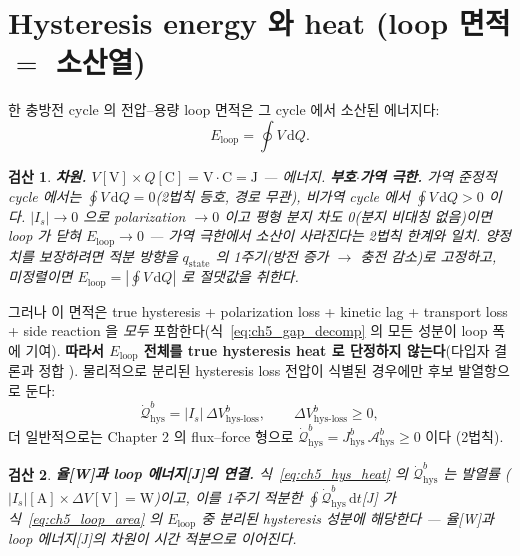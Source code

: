 \documentclass[11pt,a4paper]{article}
\newtheorem*{verifybox}{검산}
\newcommand{\dd}{\mathrm{d}}
\newcommand{\hys}{\mathrm{hys}}
\newcommand{\loss}{\mathrm{loss}}
\newcommand{\stt}{\mathrm{state}}
\begin{document}
\section{Hysteresis energy 와 heat (loop 면적 $=$ 소산열)}\label{sec:ch5_hysheat}
한 충방전 cycle 의 전압--용량 loop 면적은 그 cycle 에서 소산된 에너지다:
\begin{equation}
E_{\mathrm{loop}}=\oint V\,\dd Q.
\label{eq:ch5_loop_area}
\end{equation}

\begin{verifybox}
\textbf{차원.} $V[\mathrm V]\times Q[\mathrm C]=\mathrm{V\cdot C}=\mathrm J$ — 에너지. \textbf{부호$\cdot$가역
극한.} 가역 준정적 cycle 에서는 $\oint V\,\dd Q=0$(2법칙 등호, 경로 무관), 비가역 cycle 에서 $\oint V\,\dd Q>0$
이다. $|I_s|\to0$ 으로 polarization $\to0$ 이고 평형 분지 차도 0(분지 비대칭 없음)이면 loop 가 닫혀
$E_{\mathrm{loop}}\to0$ — 가역 극한에서 소산이 사라진다는 2법칙 한계와 일치. 양정치를 보장하려면 적분 방향을
$q_\stt$ 의 1주기(방전 증가 $\to$ 충전 감소)로 고정하고, 미정렬이면 $E_{\mathrm{loop}}=|\oint V\,\dd Q|$ 로
절댓값을 취한다.
\end{verifybox}

그러나 이 면적은 true hysteresis + polarization loss + kinetic lag + transport loss + side reaction 을
\emph{모두} 포함한다(식~\eqref{eq:ch5_gap_decomp} 의 모든 성분이 loop 폭에 기여). \textbf{따라서
$E_{\mathrm{loop}}$ 전체를 true hysteresis heat 로 단정하지 않는다}(다입자 결론과 정합 \cite{dreyer2010}).
물리적으로 분리된 hysteresis loss 전압이 식별된 경우에만 후보 발열항으로 둔다:
\begin{equation}
\dot{\mathcal Q}_{\hys}^b=|I_s|\,\Delta V_{\hys\text{-}\loss}^b,\qquad \Delta V_{\hys\text{-}\loss}^b\ge0,
\label{eq:ch5_hys_heat}
\end{equation}
더 일반적으로는 Chapter 2 의 flux--force 형으로 $\dot{\mathcal Q}_{\hys}^b=J_\hys^b\,\mathcal A_\hys^b\ge0$ 이다
(2법칙).

\begin{verifybox}
\textbf{율[W]과 loop 에너지[J]의 연결.} 식~\eqref{eq:ch5_hys_heat} 의 $\dot{\mathcal Q}_{\hys}^b$ 는 발열률
($|I_s|[\mathrm A]\times\Delta V[\mathrm V]=\mathrm W$)이고, 이를 1주기 적분한 $\oint\dot{\mathcal Q}_{\hys}^b\,\dd t$[J]
가 식~\eqref{eq:ch5_loop_area} 의 $E_{\mathrm{loop}}$ 중 \emph{분리된 hysteresis 성분}에 해당한다 — 율[W]과 loop
에너지[J]의 차원이 시간 적분으로 이어진다.
\end{verifybox}
\end{document}
